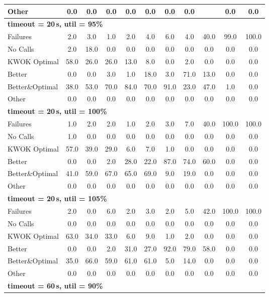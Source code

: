 \begin{tabular}{l cccccccccc}
Other & 0.0 & 0.0 & 0.0 & 0.0 & 0.0 & 0.0 & 0.0 & \text{--} & 0.0 & 0.0 \\
\midrule
\multicolumn{11}{l}{\textbf{timeout = 20\,s, util = 95\%}} \\
\midrule
Failures & 2.0 & 3.0 & 1.0 & 2.0 & 4.0 & 6.0 & 4.0 & 40.0 & 99.0 & 100.0 \\
No Calls & 2.0 & 18.0 & 0.0 & 0.0 & 0.0 & 0.0 & 0.0 & 0.0 & 0.0 & 0.0 \\
KWOK Optimal & 58.0 & 26.0 & 26.0 & 13.0 & 8.0 & 0.0 & 2.0 & 0.0 & 0.0 & 0.0 \\
Better & 0.0 & 0.0 & 3.0 & 1.0 & 18.0 & 3.0 & 71.0 & 13.0 & 0.0 & 0.0 \\
Better\&Optimal & 38.0 & 53.0 & 70.0 & 84.0 & 70.0 & 91.0 & 23.0 & 47.0 & 1.0 & 0.0 \\
Other & 0.0 & 0.0 & 0.0 & 0.0 & 0.0 & 0.0 & 0.0 & 0.0 & 0.0 & 0.0 \\
\midrule
\multicolumn{11}{l}{\textbf{timeout = 20\,s, util = 100\%}} \\
\midrule
Failures & 1.0 & 2.0 & 2.0 & 1.0 & 2.0 & 3.0 & 7.0 & 40.0 & 100.0 & 100.0 \\
No Calls & 1.0 & 0.0 & 0.0 & 0.0 & 0.0 & 0.0 & 0.0 & 0.0 & 0.0 & 0.0 \\
KWOK Optimal & 57.0 & 39.0 & 29.0 & 6.0 & 7.0 & 1.0 & 0.0 & 0.0 & 0.0 & 0.0 \\
Better & 0.0 & 0.0 & 2.0 & 28.0 & 22.0 & 87.0 & 74.0 & 60.0 & 0.0 & 0.0 \\
Better\&Optimal & 41.0 & 59.0 & 67.0 & 65.0 & 69.0 & 9.0 & 19.0 & 0.0 & 0.0 & 0.0 \\
Other & 0.0 & 0.0 & 0.0 & 0.0 & 0.0 & 0.0 & 0.0 & 0.0 & 0.0 & 0.0 \\
\midrule
\multicolumn{11}{l}{\textbf{timeout = 20\,s, util = 105\%}} \\
\midrule
Failures & 2.0 & 0.0 & 6.0 & 2.0 & 3.0 & 2.0 & 5.0 & 42.0 & 100.0 & 100.0 \\
No Calls & 0.0 & 0.0 & 0.0 & 0.0 & 0.0 & 0.0 & 0.0 & 0.0 & 0.0 & 0.0 \\
KWOK Optimal & 63.0 & 34.0 & 33.0 & 6.0 & 9.0 & 1.0 & 2.0 & 0.0 & 0.0 & 0.0 \\
Better & 0.0 & 0.0 & 2.0 & 31.0 & 27.0 & 92.0 & 79.0 & 58.0 & 0.0 & 0.0 \\
Better\&Optimal & 35.0 & 66.0 & 59.0 & 61.0 & 61.0 & 5.0 & 14.0 & 0.0 & 0.0 & 0.0 \\
Other & 0.0 & 0.0 & 0.0 & 0.0 & 0.0 & 0.0 & 0.0 & 0.0 & 0.0 & 0.0 \\
\midrule
\multicolumn{11}{l}{\textbf{timeout = 60\,s, util = 90\%}} \\

\end{tabular}
